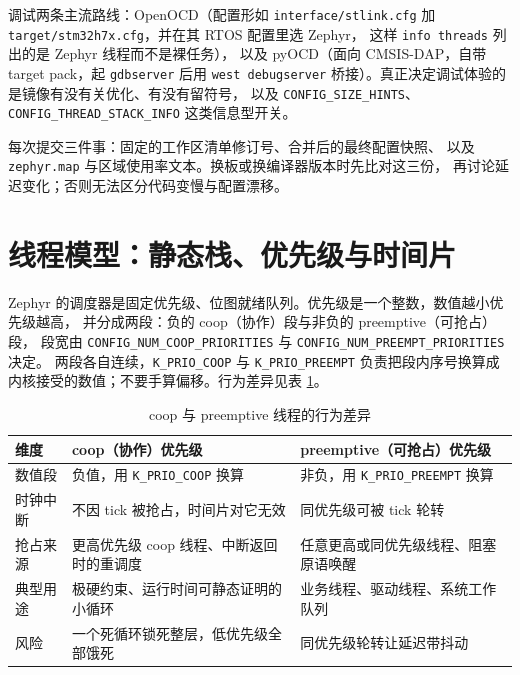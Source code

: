\documentclass[12pt,a4paper,fontset=fandol]{ctexbook}
\newcommand{\Tp}[1]{\texttt{#1}}
\newcommand{\Bk}{\discretionary{}{}{}}
\begin{document}
调试两条主流路线：OpenOCD（配置形如 \Tp{interface/{\Bk}stlink.cfg} 加
\Tp{target/{\Bk}stm32h7x.cfg}，并在其 RTOS 配置里选 Zephyr，
这样 \Tp{info threads} 列出的是 Zephyr 线程而不是裸任务），
以及 pyOCD（面向 CMSIS-DAP，自带 target pack，起 \Tp{gdbserver} 后用
\Tp{west debugserver} 桥接）。真正决定调试体验的是镜像有没有关优化、有没有留符号，
以及 \Tp{CONFIG\_{\Bk}SIZE\_{\Bk}HINTS}、\Tp{CONFIG\_{\Bk}THREAD\_{\Bk}STACK\_{\Bk}INFO} 这类信息型开关。

\begin{guideline}[title={可复现的实时构建基线}]
每次提交三件事：固定的工作区清单修订号、合并后的最终配置快照、
以及 \Tp{zephyr.map} 与区域使用率文本。换板或换编译器版本时先比对这三份，
再讨论延迟变化；否则无法区分代码变慢与配置漂移。
\end{guideline}

\section{线程模型：静态栈、优先级与时间片}
\label{sec:ch07-threads}

Zephyr 的调度器是固定优先级、位图就绪队列。优先级是一个整数，数值越小优先级越高，
并分成两段：负的 coop（协作）段与非负的 preemptive（可抢占）段，
段宽由 \Tp{CONFIG\_NUM\_COOP\_PRIORITIES} 与 \Tp{CONFIG\_NUM\_PREEMPT\_PRIORITIES} 决定。
两段各自连续，\Tp{K\_PRIO\_COOP} 与 \Tp{K\_PRIO\_PREEMPT} 负责把段内序号换算成
内核接受的数值；不要手算偏移。行为差异见表 \ref{tab:ch07-coop-preempt}。

\begin{table}[htbp]
\centering
\caption{coop 与 preemptive 线程的行为差异}\label{tab:ch07-coop-preempt}
\begin{tabular}{>{\raggedright\arraybackslash}p{}
                >{\raggedright\arraybackslash}p{}
                >{\raggedright\arraybackslash}p{}}
\toprule
维度 & coop（协作）优先级 & preemptive（可抢占）优先级 \\
\midrule
数值段 & 负值，用 \Tp{K\_PRIO\_COOP} 换算 & 非负，用 \Tp{K\_PRIO\_PREEMPT} 换算 \\
时钟中断 & 不因 tick 被抢占，时间片对它无效 & 同优先级可被 tick 轮转 \\
抢占来源 & 更高优先级 coop 线程、中断返回时的重调度 & 任意更高或同优先级线程、阻塞原语唤醒 \\
典型用途 & 极硬约束、运行时间可静态证明的小循环 & 业务线程、驱动线程、系统工作队列 \\
风险 & 一个死循环锁死整层，低优先级全部饿死 & 同优先级轮转让延迟带抖动 \\
\bottomrule
\end{tabular}
\end{table}
\end{document}
